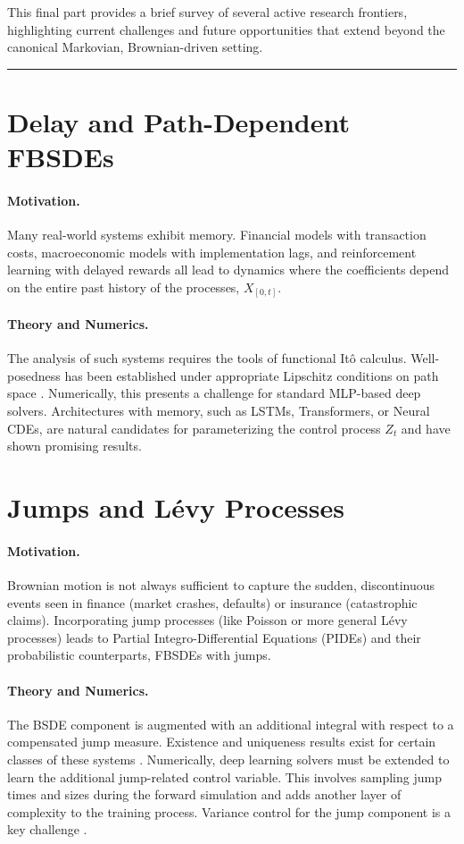 \documentclass[11pt,letterpaper,oneside]{article}
\theoremstyle{plain}
\theoremstyle{definition}
\theoremstyle{remark}
\begin{document}
This final part provides a brief survey of several active research frontiers, highlighting current challenges and future opportunities that extend beyond the canonical Markovian, Brownian-driven setting.

\bigskip\hrule\bigskip

\section{Delay and Path-Dependent FBSDEs}
\label{sec:path_dependence}

\paragraph{Motivation.} Many real-world systems exhibit memory. Financial models with transaction costs, macroeconomic models with implementation lags, and reinforcement learning with delayed rewards all lead to dynamics where the coefficients depend on the entire past history of the processes, \(X_{[0,t]}\).

\paragraph{Theory and Numerics.} The analysis of such systems requires the tools of functional Itô calculus. Well-posedness has been established under appropriate Lipschitz conditions on path space \cite{ContFournie2013}. Numerically, this presents a challenge for standard MLP-based deep solvers. Architectures with memory, such as LSTMs, Transformers, or Neural CDEs, are natural candidates for parameterizing the control process \(Z_t\) and have shown promising results.

\section{Jumps and Lévy Processes}
\label{sec:jumps}

\paragraph{Motivation.} Brownian motion is not always sufficient to capture the sudden, discontinuous events seen in finance (market crashes, defaults) or insurance (catastrophic claims). Incorporating jump processes (like Poisson or more general Lévy processes) leads to Partial Integro-Differential Equations (PIDEs) and their probabilistic counterparts, FBSDEs with jumps.

\paragraph{Theory and Numerics.} The BSDE component is augmented with an additional integral with respect to a compensated jump measure. Existence and uniqueness results exist for certain classes of these systems \cite{BarlesBuckdahnPardoux1997}. Numerically, deep learning solvers must be extended to learn the additional jump-related control variable. This involves sampling jump times and sizes during the forward simulation and adds another layer of complexity to the training process. Variance control for the jump component is a key challenge \cite{Bachouch2022}.
\end{document}
